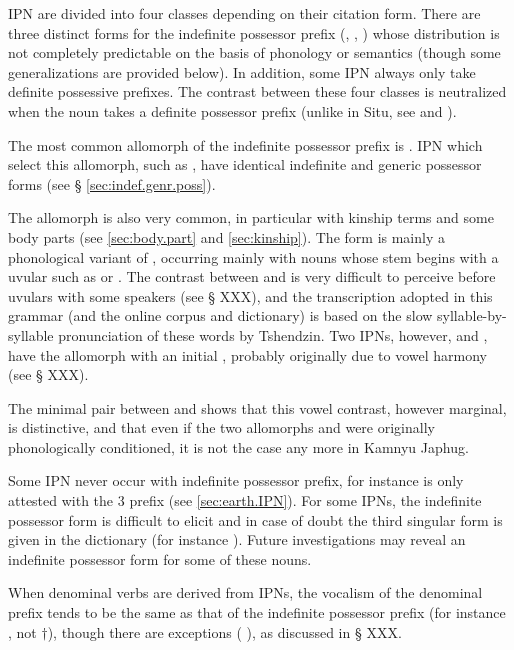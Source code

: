 IPN are divided into four classes depending on their citation form. There are three distinct forms for the indefinite possessor prefix (, , ) whose distribution is not completely predictable on the basis of phonology or semantics (though some generalizations are provided below). In addition, some IPN always only take definite possessive prefixes. The contrast between these four classes is neutralized when the noun takes a definite possessor prefix (unlike in Situ, see \citealt[168-169]{linxr93jiarongen} and \citealt[118-119]{prins16kyomkyo}).

The most common allomorph of the indefinite possessor prefix is . IPN which select this allomorph, such as , have identical indefinite and generic possessor forms (see § \ref{sec:indef.genr.poss}).

The allomorph  is also very common, in particular with kinship terms and some body parts (see \ref{sec:body.part} and \ref{sec:kinship}). The form  is mainly a phonological variant of , occurring mainly with nouns whose stem begins with a uvular such as  or . The contrast between  and  is very difficult to perceive before uvulars with some speakers (see § XXX), and the transcription adopted in this grammar (and the online corpus and dictionary) is based on the slow syllable-by-syllable pronunciation of these words by Tshendzin. Two IPNs, however,  and , have the  allomorph with an initial , probably originally due to vowel harmony (see § XXX).

The minimal pair between  and  shows that this vowel contrast, however marginal, is distinctive, and that even if the two allomorphs  and  were originally phonologically conditioned, it is not the case any more in Kamnyu Japhug.

Some IPN never occur with indefinite possessor prefix, for instance  is only attested with the 3\sg{}  prefix (see \ref{sec:earth.IPN}). For some IPNs, the indefinite possessor form is difficult to elicit and in case of doubt the third singular form is given in the dictionary \citet{jacques16japhug} (for instance ). Future investigations may reveal an indefinite possessor form for some of these nouns.

When denominal verbs are derived from IPNs, the vocalism of the denominal prefix tends to be the same as that of the  indefinite possessor prefix (for instance  \fl{} , not $\dagger$), though there are exceptions ( \fl{} ), as discussed in § XXX.

